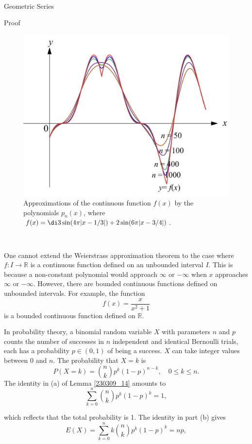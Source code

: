 \begin{example}[label=230305_16]{Geometric Series}
\begin{example}[label=230304_9]{}
\begin{example}{}
\begin{example}{}
\begin{myproof}{Proof}
\end{myproof}
\begin{figure}[ht]
\centering
\includegraphics[scale=0.2]{Picture68.png}
\caption{Approximations of the continuous function $f(x)$ by the polynomials $p_n(x)$, where $f(x)=\di 3\sin( 4\pi|x-1/3|)+2\sin (6\pi|x-3/4|)$.\fa}\label{figure68}
\end{figure}
~
 
One cannot extend the Weierstrass approximation theorem to the case where $f:I\to\mathbb{R}$ is a continuous function defined on an unbounded interval $I$.  This is because a non-constant polynomial would approach $\infty$ or $-\infty$ when $x$ approaches $\infty$ or $-\infty$. However, there are bounded continuous functions defined on unbounded intervals. For example, the function
\[f(x)=\frac{x}{x^2+1}\] is a bounded continuous function defined on $\mathbb{R}$.

 



\begin{remark}
{}

In probability theory, a binomial random variable $X$ with parameters $n$ and $p$ counts the number of successes in $n$ independent and identical Bernoulli trials, each has a probability $p\in (0,1)$ of being a success.  $X$ can take integer values between $0$ and $n$. The probability that $X=k$ is
\[P(X=k)=\binom{n}{k}p^k(1-p)^{n-k},\quad 0\leq k\leq n.\]
The identity in (a) of Lemma \ref{230309_14} amounts to
\[\sum_{k=0}^n \binom{n}{k}p^k(1-p)^k=1,\]
\end{remark}\begin{highlight}{}
which reflects that the total probability is 1. The identity in part (b) gives 
\[E(X)=\sum_{k=0}^n k\binom{n}{k}p^k(1-p)^k=np,\]


\end{highlight}
\end{example}
\end{example}
\end{example}
\end{example}
